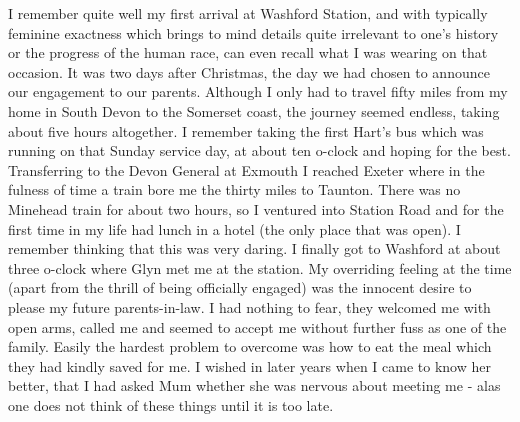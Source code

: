 I remember quite well my first arrival at Washford Station, and with typically feminine exactness which brings to mind details quite irrelevant to one's history or the progress of the human race, can even recall what I was wearing on that occasion. It was two days after Christmas, the day we had chosen to announce our engagement to our parents. Although I only had to travel fifty miles from my home in South Devon to the Somerset coast, the journey seemed endless, taking about five hours altogether. I remember taking the first Hart's bus which was running on that Sunday service day, at about ten o-clock and hoping for the best. Transferring to the Devon General at Exmouth I reached Exeter where in the fulness of time a train bore me the thirty miles to Taunton. There was no Minehead train for about two hours, so I ventured into Station Road and for the first time in my life had lunch in a hotel (the only place that was open). I remember thinking that this was very daring. I finally got to Washford at about three o-clock where Glyn met me at the station. My overriding feeling at the time (apart from the thrill of being officially engaged) was the innocent desire to please my future parents-in-law. I had nothing to fear, they welcomed me with open arms, called me  and seemed to accept me without further fuss as one of the family. Easily the hardest problem to overcome was how to eat the meal which they had kindly saved for me. I wished in later years when I came to know her better, that I had asked Mum whether she was nervous about meeting me - alas one does not think of these things until it is too late.